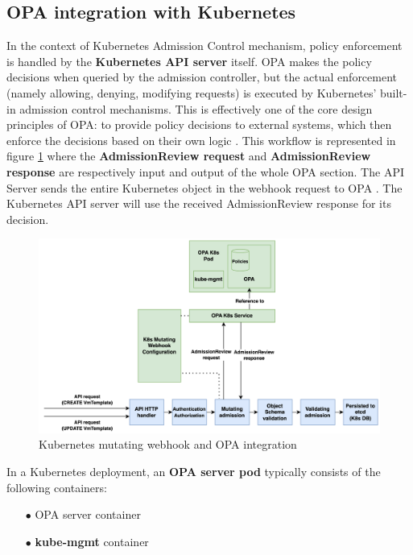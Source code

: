 \subsection{OPA integration with Kubernetes}

In the context of Kubernetes Admission Control mechanism, policy enforcement is handled by the \textbf{Kubernetes API server} itself. 
OPA makes the policy decisions when queried by the admission controller, but the actual enforcement (namely allowing, denying, modifying requests) is executed by Kubernetes' built-in admission control mechanisms. 
This is effectively one of the core design principles of OPA: to provide policy decisions to external systems, which then enforce the decisions based on their own logic \cite{opa_kubernetes_primer}.
This workflow is represented in figure \ref{fig:webhook_opa} where the \textbf{AdmissionReview request} and \textbf{AdmissionReview response} are respectively input and output of the whole OPA section. 
The API Server sends the entire Kubernetes object in the webhook request to OPA \cite{opa_kubernetes_primer}.
The Kubernetes API server will use the received AdmissionReview response for its decision. \\

\begin{figure}[t]
\centering
\includegraphics[width=1\linewidth]{images/webhook.png}
\caption{Kubernetes mutating webhook and OPA integration}
\label{fig:webhook_opa}
\end{figure}

In a Kubernetes deployment, an \textbf{OPA server pod} typically consists of the following containers:
\begin{itemize}[itemsep=0.2pt, topsep=1pt]
  \item[$\bullet$] OPA server container
  \item[$\bullet$] \textbf{kube-mgmt} container \\
\end{itemize} 

